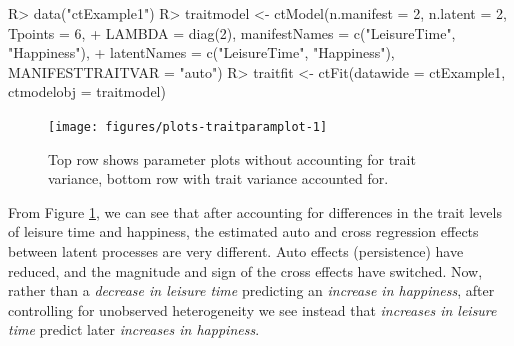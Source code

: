 \documentclass[nojss]{jss}\usepackage[]{graphicx}\usepackage[]{color}
\begin{document}
\begin{Schunk}
\begin{Sinput}
R> data("ctExample1")
R> traitmodel <- ctModel(n.manifest = 2, n.latent = 2, Tpoints = 6, 
+   LAMBDA = diag(2), manifestNames = c("LeisureTime", "Happiness"), 
+   latentNames = c("LeisureTime", "Happiness"), MANIFESTTRAITVAR = "auto")
R> traitfit <- ctFit(datawide = ctExample1, ctmodelobj = traitmodel)
\end{Sinput}
\end{Schunk}

\begin{figure}[!h]
\begin{Schunk}


{\centering \texttt{[image: figures/plots-traitparamplot-1]} 

}

\end{Schunk}
\caption{ \label{fig:traitparamplots} Top row shows parameter plots without accounting for trait variance, bottom row with trait variance accounted for.}
\end{figure}
From Figure \ref{fig:traitparamplots}, we can see that after accounting for differences in the trait levels of leisure time and happiness, the estimated auto and cross regression effects between latent processes are very different. Auto effects (persistence) have reduced, and the magnitude and sign of the cross effects have switched. Now, rather than a \textit{decrease in leisure time} predicting an \textit{increase in happiness}, after controlling for unobserved heterogeneity we see instead that \textit{increases in leisure time} predict later \textit{increases in happiness}. 
\end{document}
